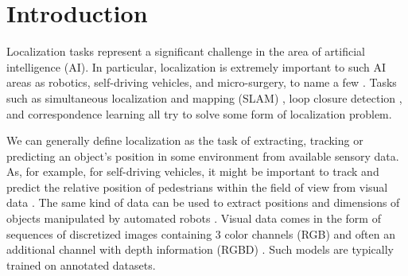 
\chapter{Introduction}
\label{ch:intro}

%
%
%


Localization tasks represent a significant challenge in the area of artificial intelligence (AI).
In particular, localization is extremely important to such AI areas as robotics, self-driving vehicles, and micro-surgery, to name a few \cite{Wang2017, Mountney2006}.
Tasks such as simultaneous localization and mapping (SLAM) \cite{Cadena2015, Zikos2016}, loop closure detection \cite{Xia2016, Gao2015a, Huang2016}, and correspondence learning \cite{Boscaini2016} all try to solve some form of localization problem.

We can generally define localization as the task of extracting, tracking or predicting an object's position in some environment from available sensory data. As, for example, for self-driving vehicles, it might be important to track and predict the relative position of pedestrians within the field of view from visual data \cite{Dollar2009}. The same kind of data can be used to extract positions and dimensions of objects manipulated by automated robots \cite{Hernandez2016}. Visual data comes in the form of sequences of discretized images containing 3 color channels (RGB) and often an additional channel with depth information (RGBD) \cite{Long2015}. Such models are typically trained on annotated datasets.

